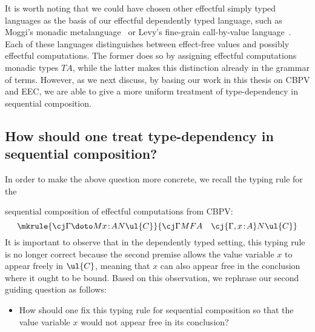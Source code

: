 It is worth noting that we could have chosen other effectful simply typed languages as the basis of our effectful dependently typed language, such as Moggi's monadic metalanguage~\cite{Moggi:NotionsofComputationandMonads} or Levy's fine-grain call-by-value language~\cite[Appendix~A.3.2]{Levy:CBPV}. Each of these languages distinguishes between effect-free values and possibly effectful computations. The former does so by assigning effectful computations monadic types $TA$, while the latter makes this distinction already in the grammar of terms. However, as we next discuss, by basing our work in this thesis on CBPV and EEC, we are able to give a more uniform treatment of type-dependency in sequential composition.

\subsection*{How should one treat type-dependency in sequential composition?}

In order to make the above question more concrete, we recall the typing rule for the \linebreak 

\pagebreak
\noindent
sequential composition of effectful computations from CBPV:
\vspace{0.15cm}
\[
\mkrule
{\cj \Gamma {\doto M {x \!:\! A} {} N} {\ul{C}}}
{
\cj \Gamma M FA
\quad
\cj {\Gamma, x \!:\! A} N \ul{C}
}
\vspace{-0.1cm}
\]
%
It is important to observe that in the dependently typed setting, this typing rule is no longer correct because the second premise allows the value variable $x$ to appear freely in $\ul{C}$, meaning that $x$ can also appear free in the conclusion where it ought to be bound.
Based on this observation, we rephrase our second guiding question as follows:
\begin{itemize}
\item How should one fix this typing rule for sequential composition so that the value variable $x$ would not appear free in its conclusion?
\end{itemize}

